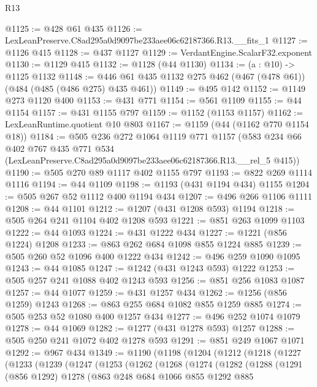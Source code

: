 \begin{lexlean}{R13}
\begin{coremodule}
@1125 := @428 @61 @435
@1126 := LexLeanPreserve.C8ad295a0d9097be233aee06c62187366.R13.__fits_1
@1127 := @1126 @415
@1128 := @437 @1127
@1129 := VerdantEngine.ScalarF32.exponent
@1130 := @1129 @415
@1132 := @1128 (@44 @1130)
@1134 := (a : @10) -> @1125 @1132
@1148 := @446 @61 @435 @1132 @275 @462 (@467 (@478 @61)) (@484 (@485 (@486 @275) @435 @461))
@1149 := @495 @142
@1152 := @1149 @273 @1120 @400
@1153 := @431 @771
@1154 := @561 @1109
@1155 := @44 @1154
@1157 := @431 @1155 @797
@1159 := @1152 (@1153 @1157)
@1162 := LexLeanRuntime.quotient @10 @803
@1167 := @1159 (@44 (@1162 @770 @1154 @18))
@1184 := @505
    @236
    @272
    @1064
    @1119
    @771
    @1157
    (@583
      @234
      @66
      @402
      @767
      @435
      @771
      @534
      (LexLeanPreserve.C8ad295a0d9097be233aee06c62187366.R13.__rel_5 @415))
@1190 := @505 @270 @89 @1117 @402 @1155 @797
@1193 := @822 @269 @1114 @1116
@1194 := @44 @1109
@1198 := @1193 (@431 @1194 @434) @1155
@1204 := @505 @267 @52 @1112 @400 @1194 @434
@1207 := @496 @266 @1106 @1111
@1208 := @44 @1101
@1212 := @1207 (@431 @1208 @593) @1194
@1218 := @505 @264 @241 @1104 @402 @1208 @593
@1221 := @851 @263 @1099 @1103
@1222 := @44 @1093
@1224 := @431 @1222 @434
@1227 := @1221 (@856 @1224) @1208
@1233 := @863 @262 @684 @1098 @855 @1224 @885
@1239 := @505 @260 @52 @1096 @400 @1222 @434
@1242 := @496 @259 @1090 @1095
@1243 := @44 @1085
@1247 := @1242 (@431 @1243 @593) @1222
@1253 := @505 @257 @241 @1088 @402 @1243 @593
@1256 := @851 @256 @1083 @1087
@1257 := @44 @1077
@1259 := @431 @1257 @434
@1262 := @1256 (@856 @1259) @1243
@1268 := @863 @255 @684 @1082 @855 @1259 @885
@1274 := @505 @253 @52 @1080 @400 @1257 @434
@1277 := @496 @252 @1074 @1079
@1278 := @44 @1069
@1282 := @1277 (@431 @1278 @593) @1257
@1288 := @505 @250 @241 @1072 @402 @1278 @593
@1291 := @851 @249 @1067 @1071
@1292 := @967 @434
@1349 := @1190
    (@1198
      (@1204
        (@1212
          (@1218
            (@1227
              (@1233
                (@1239
                  (@1247
                    (@1253
                      (@1262
                        (@1268
                          (@1274
                            (@1282
                              (@1288
                                (@1291
                                  (@856 @1292)
                                  @1278
                                  (@863
                                    @248
                                    @684
                                    @1066
                                    @855
                                    @1292
                                    @885

\end{coremodule}
\end{lexlean}
